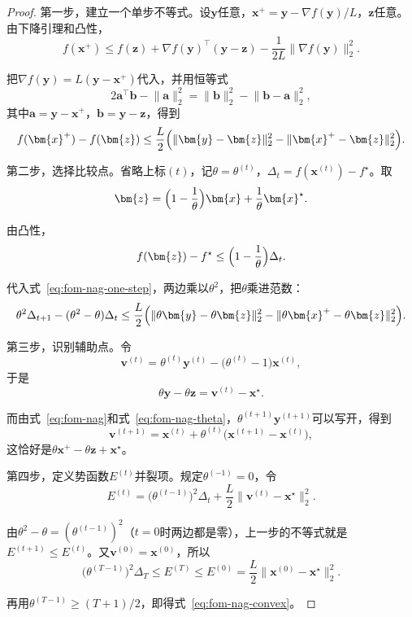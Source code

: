 \begin{proof}
第一步，建立一个单步不等式。设$\bm{y}$任意，$\bm{x}^+=\bm{y}-\nabla f(\bm{y})/L$，$\bm{z}$任意。由下降引理和凸性，
\[
 f(\bm{x}^+)\leq f(\bm{z})+\nabla f(\bm{y})^\top(\bm{y}-\bm{z})-\frac{1}{2L}\lVert\nabla f(\bm{y})\rVert_2^2.
\]

把$\nabla f(\bm{y})=L(\bm{y}-\bm{x}^+)$代入，并用恒等式
\[
 2\bm{a}^\top\bm{b}-\lVert\bm{a}\rVert_2^2=\lVert\bm{b}\rVert_2^2-\lVert\bm{b}-\bm{a}\rVert_2^2,
\]
其中$\bm{a}=\bm{y}-\bm{x}^+$，$\bm{b}=\bm{y}-\bm{z}$，得到
\begin{equation}
 f(\bm{x}^+)-f(\bm{z})\leq\frac L2\Bigl(\lVert\bm{y}-\bm{z}\rVert_2^2-\lVert\bm{x}^+-\bm{z}\rVert_2^2\Bigr).
 \label{eq:fom-nag-one-step}
\end{equation}

第二步，选择比较点。省略上标$(t)$，记$\theta=\theta^{(t)}$，$\Delta_t=f(\bm{x}^{(t)})-f^\star$。取
\[
 \bm{z}=\Bigl(1-\frac1\theta\Bigr)\bm{x}+\frac1\theta\bm{x}^\star.
\]

由凸性，
\[
 f(\bm{z})-f^\star\leq\Bigl(1-\frac1\theta\Bigr)\Delta_t.
\]

代入式~\eqref{eq:fom-nag-one-step}，两边乘以$\theta^2$，把$\theta$乘进范数：
\[
 \theta^2\Delta_{t+1}-(\theta^2-\theta)\Delta_t\leq\frac L2\Bigl(\lVert\theta\bm{y}-\theta\bm{z}\rVert_2^2-\lVert\theta\bm{x}^+-\theta\bm{z}\rVert_2^2\Bigr).
\]

第三步，识别辅助点。令
\[
 \bm{v}^{(t)}=\theta^{(t)}\bm{y}^{(t)}-\bigl(\theta^{(t)}-1\bigr)\bm{x}^{(t)},
\]
于是
\[
 \theta\bm{y}-\theta\bm{z}=\bm{v}^{(t)}-\bm{x}^\star.
\]

而由式~\eqref{eq:fom-nag}和式~\eqref{eq:fom-nag-theta}，$\theta^{(t+1)}\bm{y}^{(t+1)}$可以写开，得到
\[
 \bm{v}^{(t+1)}=\bm{x}^{(t)}+\theta^{(t)}\bigl(\bm{x}^{(t+1)}-\bm{x}^{(t)}\bigr),
\]
这恰好是$\theta\bm{x}^+-\theta\bm{z}+\bm{x}^\star$。

第四步，定义势函数$E^{(t)}$并裂项。规定$\theta^{(-1)}=0$，令
\[
 E^{(t)}=\bigl(\theta^{(t-1)}\bigr)^2\Delta_t+\frac L2\lVert\bm{v}^{(t)}-\bm{x}^\star\rVert_2^2.
\]

由$\theta^2-\theta=(\theta^{(t-1)})^2$（$t=0$时两边都是零），上一步的不等式就是$E^{(t+1)}\leq E^{(t)}$。又$\bm{v}^{(0)}=\bm{x}^{(0)}$，所以
\[
 \bigl(\theta^{(T-1)}\bigr)^2\Delta_T\leq E^{(T)}\leq E^{(0)}=\frac L2\lVert\bm{x}^{(0)}-\bm{x}^\star\rVert_2^2.
\]

再用$\theta^{(T-1)}\geq(T+1)/2$，即得式~\eqref{eq:fom-nag-convex}。
\end{proof}

